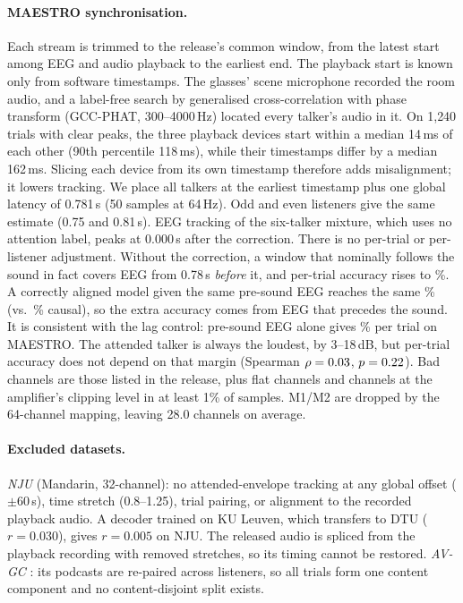 \documentclass[twoside]{article}
\begin{document}
\paragraph{MAESTRO synchronisation.} Each stream is trimmed to the release's common window,
from the latest start among EEG and audio playback to the earliest end. The playback start is
known only from software timestamps. The glasses' scene microphone recorded the room audio,
and a label-free search by generalised cross-correlation with phase transform (GCC-PHAT,
300--4000\,Hz) located every talker's audio in it. On 1{,}240
trials with clear peaks, the three playback devices start within a median 14\,ms of each
other (90th percentile 118\,ms), while their timestamps differ by a median 162\,ms. Slicing
each device from its own timestamp therefore adds misalignment; it lowers tracking. We place
all talkers at the earliest timestamp plus one global latency of 0.781\,s (50 samples at
64\,Hz). Odd and even listeners give the same estimate (0.75 and 0.81\,s). EEG tracking of
the six-talker mixture, which uses no attention label, peaks at 0.000\,s after the
correction. There is no per-trial or per-listener adjustment. Without the correction, a window
that nominally follows the sound in fact covers EEG from 0.78\,s \emph{before} it, and
per-trial accuracy rises to \maePkgTrial\%. A correctly aligned model given the same pre-sound
EEG reaches the same \maePreTrial\% (vs.\ \maeCompTrial\% causal), so the extra accuracy comes
from EEG that precedes the sound. It is consistent with the lag control: pre-sound EEG alone
gives \maBeforeTrial\% per trial on MAESTRO. The attended talker is always the loudest, by
3--18\,dB, but per-trial accuracy does not depend on that margin (Spearman
$\rho=0.03$, $p=0.22$). Bad channels are those listed
in the release, plus flat channels and channels at the amplifier's clipping level in at
least 1\% of samples. M1/M2 are dropped by the 64-channel mapping, leaving 28.0 channels on
average.

\paragraph{Excluded datasets.}
\emph{NJU} \citep{zhang2023learnable} (Mandarin, 32-channel): no attended-envelope tracking at any global offset
($\pm60$\,s), time stretch (0.8--1.25), trial pairing, or alignment to the recorded
playback audio. A decoder trained on KU Leuven, which transfers to DTU ($r=0.030$), gives
$r=0.005$ on NJU. The released audio is spliced from the playback recording with removed
stretches, so its timing cannot be restored.
\emph{AV-GC} \citep{rotaru2024what}: its podcasts are re-paired across listeners, so all
trials form one content component and no content-disjoint split exists.
\end{document}
